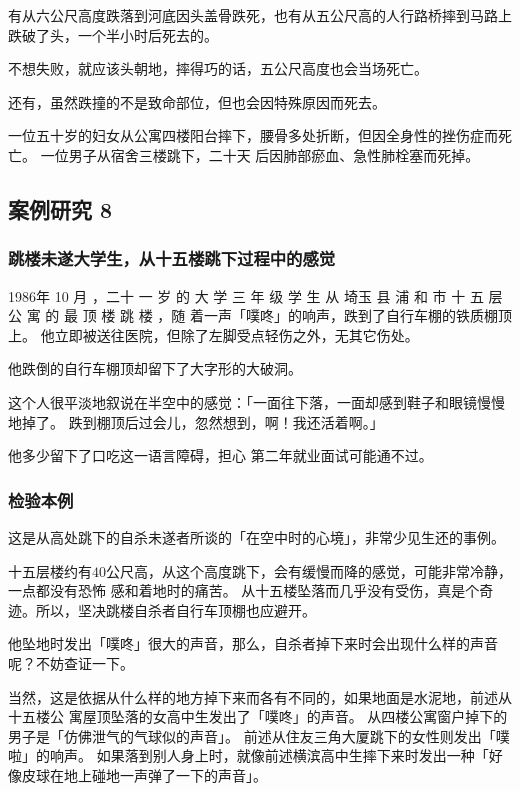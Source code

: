 \documentclass[UTF8]{ctexart}
\begin{document}
有从六公尺高度跌落到河底因头盖骨跌死，也有从五公尺高的人行路桥摔到马路上跌破了头，一个半小时后死去的。

不想失败，就应该头朝地，摔得巧的话，五公尺高度也会当场死亡。

还有，虽然跌撞的不是致命部位，但也会因特殊原因而死去。

一位五十岁的妇女从公寓四楼阳台摔下，腰骨多处折断，但因全身性的挫伤症而死亡。
一位男子从宿舍三楼跳下，二十天 后因肺部瘀血、急性肺栓塞而死掉。

\subsection{案例研究 8}
\subsubsection*{跳楼未遂大学生，从十五楼跳下过程中的感觉}

1986年 10 月 ，二十 一 岁 的 大 学 三 年 级 学 生 从 埼玉 县 浦 和 市 十 五 层 公 寓 的 最 顶 楼 跳 楼 ，随 着一声「噗咚」的响声，跌到了自行车棚的铁质棚顶上。
他立即被送往医院，但除了左脚受点轻伤之外，无其它伤处。

他跌倒的自行车棚顶却留下了大字形的大破洞。

这个人很平淡地叙说在半空中的感觉：「一面往下落，一面却感到鞋子和眼镜慢慢地掉了。
跌到棚顶后过会儿，忽然想到，啊！我还活着啊。」

他多少留下了口吃这一语言障碍，担心 第二年就业面试可能通不过。 

\subsubsection*{检验本例}


这是从高处跳下的自杀未遂者所谈的「在空中时的心境」，非常少见生还的事例。

十五层楼约有$40$公尺高，从这个高度跳下，会有缓慢而降的感觉，可能非常冷静，一点都没有恐怖
感和着地时的痛苦。
从十五楼坠落而几乎没有受伤，真是个奇迹。所以，坚决跳楼自杀者自行车顶棚也应避开。

他坠地时发出「噗咚」很大的声音，那么，自杀者掉下来时会出现什么样的声音呢？不妨查证一下。

当然，这是依据从什么样的地方掉下来而各有不同的，如果地面是水泥地，前述从十五楼公
寓屋顶坠落的女高中生发出了「噗咚」的声音。
从四楼公寓窗户掉下的男子是「仿佛泄气的气球似的声音」。
前述从住友三角大厦跳下的女性则发出「噗啦」的响声。
如果落到别人身上时，就像前述横滨高中生摔下来时发出一种「好像皮球在地上碰地一声弹了一下的声音」。
\end{document}

